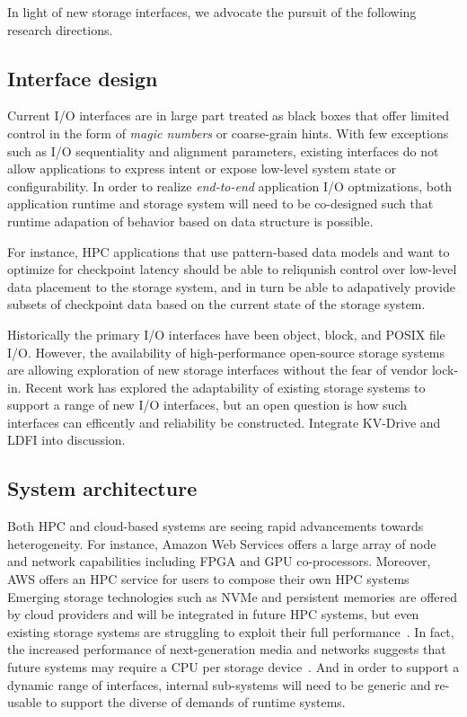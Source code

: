 \documentclass{sig-alternate}
\begin{document}
In light of new storage interfaces, we advocate the pursuit of the following
research directions.

\subsection{Interface design}

Current I/O interfaces are in large part treated as black boxes that offer
limited control in the form of \emph{magic numbers} or coarse-grain hints. With
few exceptions such as I/O sequentiality and alignment parameters, existing
interfaces do not allow applications to express intent or expose low-level system state
or configurability. In order to realize {\it end-to-end} application I/O optmizations,
both application runtime and storage system will need to be co-designed such that runtime
adapation of behavior based on data structure is possible.

For instance, HPC applications that use pattern-based data models and want to
optimize for checkpoint latency should be able to reliqunish control over low-level
data placement to the storage system, and in turn be able to adapatively provide
subsets of checkpoint data based on the current state of the storage system.

Historically the primary I/O interfaces have been object, block, and POSIX file
I/O. However, the availability of high-performance open-source storage systems
are allowing exploration of new storage interfaces without the fear of vendor
lock-in.  Recent work has explored the adaptability of existing storage systems
to support a range of new I/O interfaces, but an open question is how such
interfaces can efficently and reliability be constructed. Integrate KV-Drive and
LDFI into discussion.

\subsection{System architecture}

Both HPC and cloud-based systems are seeing rapid advancements towards
heterogeneity. For instance, Amazon Web Services offers a large array of node
and network capabilities including FPGA and GPU co-processors. Moreover, AWS
offers an HPC service for users to compose their own HPC systems Emerging
storage technologies such as NVMe and persistent memories are offered by cloud
providers and will be integrated in future HPC systems, but even existing
storage systems are struggling to exploit their full
performance~\cite{xu:fast16-nova}. In fact, the increased performance of
next-generation media and networks suggests that future systems may require a
CPU per storage device~\cite{samuels:oss16}. And in order to support a dynamic
range of interfaces, internal sub-systems will need to be generic and re-usable
to support the diverse of demands of runtime systems.
\end{document}
